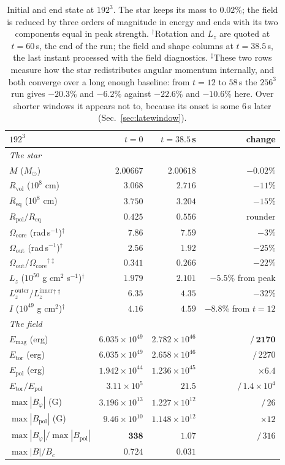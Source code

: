 \documentclass[11pt,a4paper]{article}
\newcommand{\Msun}{M_\odot}
\newcommand{\Req}{R_{\mathrm{eq}}}
\newcommand{\Rpol}{R_{\mathrm{pol}}}
\newcommand{\Rvol}{R_{\mathrm{vol}}}
\newcommand{\Btor}{B_\varphi}
\newcommand{\Bpol}{B_{\mathrm{pol}}}
\newcommand{\Etor}{E_{\mathrm{tor}}}
\newcommand{\Epol}{E_{\mathrm{pol}}}
\newcommand{\Emag}{E_{\mathrm{mag}}}
\begin{document}
\begin{table}[h]
\centering\small
\begin{tabular}{lrrr}
\toprule
$192^3$ & $t = 0$ & $t = 38.5$\,s & change \\
\midrule
\multicolumn{4}{l}{\emph{The star}}\\
$M$ ($\Msun$) & $2.00667$ & $2.00618$ & $\mathbf{-0.02\%}$ \\
$\Rvol$ ($10^8$ cm) & $3.068$ & $2.716$ & $-11\%$ \\
$\Req$ ($10^8$ cm) & $3.750$ & $3.204$ & $-15\%$ \\
$\Rpol/\Req$ & $0.425$ & $0.556$ & rounder \\
$\Omega_{\mathrm{core}}$ (rad\,s$^{-1}$)$^{\dagger}$ & $7.86$ & $7.59$ & $-3\%$ \\
$\Omega_{\mathrm{out}}$ (rad\,s$^{-1}$)$^{\dagger}$ & $2.56$ & $1.92$ & $-25\%$ \\
$\Omega_{\mathrm{out}}/\Omega_{\mathrm{core}}$$^{\dagger\ddagger}$ & $0.341$ & $0.266$ & $-22\%$ \\
$L_z$ ($10^{50}$ g cm$^2$ s$^{-1}$)$^{\dagger}$ & $1.979$ & $2.101$ & $-5.5\%$ from peak \\
$L_z^{\mathrm{outer}}/L_z^{\mathrm{inner}}$$^{\dagger\ddagger}$ & $6.35$ & $4.35$ & $-32\%$ \\
$I$ ($10^{49}$ g cm$^2$)$^{\dagger}$ & $4.16$ & $4.59$ & $-8.8\%$ from $t=12$ \\
\midrule
\multicolumn{4}{l}{\emph{The field}}\\
$\Emag$ (erg) & $6.035\times10^{49}$ & $2.782\times10^{46}$ & $\mathbf{/\,2170}$ \\
$\Etor$ (erg) & $6.035\times10^{49}$ & $2.658\times10^{46}$ & $/\,2270$ \\
$\Epol$ (erg) & $1.942\times10^{44}$ & $1.236\times10^{45}$ & $\times 6.4$ \\
$\Etor/\Epol$ & $3.11\times10^{5}$ & $21.5$ & $/\,1.4\times10^{4}$ \\
$\max|\Btor|$ (G) & $3.196\times10^{13}$ & $1.227\times10^{12}$ & $/\,26$ \\
$\max|\Bpol|$ (G) & $9.46\times10^{10}$ & $1.148\times10^{12}$ & $\times 12$ \\
$\max|\Btor|/\max|\Bpol|$ & $\mathbf{338}$ & $\mathbf{1.07}$ & $/\,316$ \\
$\max|B|/B_c$ & $0.724$ & $0.031$ & \\
\bottomrule
\end{tabular}
\caption{Initial and end state at $192^3$. The star keeps its mass to $0.02\%$;
the field is reduced by three orders of magnitude in energy and ends with its
two components equal in peak strength. $^{\dagger}$Rotation and $L_z$ are
quoted at $t = 60$\,s, the end of the run; the field and shape columns at
$t = 38.5$\,s, the last instant processed with the field diagnostics.
$^{\ddagger}$These two rows measure how the star redistributes angular momentum
internally, and both converge over a long enough baseline: from $t = 12$ to
$58$\,s the $256^3$ run gives $-20.3\%$ and $-6.2\%$ against $-22.6\%$ and
$-10.6\%$ here. Over shorter windows it appears not to, because its onset is
some $6$\,s later (Sec.~\ref{sec:latewindow}).}
\label{tab:end}
\end{table}
\end{document}
